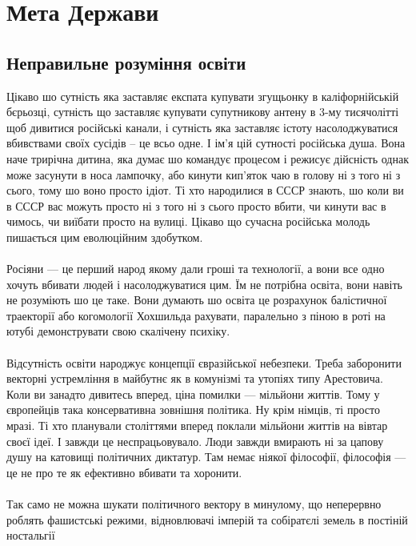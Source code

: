 
\section{Мета Держави}

\subsection{Неправильне розуміння освіти}

Цікаво шо сутність яка заставляє експата купувати згущьонку в каліфорнійській бєрьозці,
сутність що заставляє купувати супутникову антену в 3-му тисячолітті щоб дивитися
російські канали, і сутність яка заставляє істоту насолоджуватися вбивствами своїх
сусідів -- це всьо одне. І ім'я цій сутності російська душа. Вона наче трирічна
дитина, яка думає шо командує процесом і режисує дійсність однак може засунути
в носа лампочку, або кинути кип'яток чаю в голову ні з того ні з сього, тому шо
воно просто ідіот. Ті хто народилися в СССР знають, шо коли ви в СССР вас можуть
просто ні з того ні з сього просто вбити, чи кинути вас в чимось, чи виїбати
просто на вулиці. Цікаво що сучасна російська молодь пишається цим еволюційним здобутком.
\\
\\
Росіяни — це перший народ якому дали гроші та технології, а вони все одно хочуть
вбивати людей і насолоджуватися цим. Їм не потрібна освіта, вони навіть не
розуміють шо це таке. Вони думають шо освіта це розрахунок балістичної траекторії
або когомології Хохшильда рахувати, паралельно з піною в роті на ютубі демонструвати
свою скалічену психіку.
\\
\\
Відсутність освіти народжує концепції євразійської небезпеки. Треба заборонити
векторні устремління в майбутнє як в комунізмі та утопіях типу Арестовича.
Коли ви занадто дивитесь вперед, ціна помилки — мільйони життів. Тому у європейців
така консервативна зовнішня політика. Ну крім німців, ті просто мразі.
Ті хто планували століттями вперед поклали мільйони життів на вівтар своєї ідеї.
І завжди це неспрацьовувало. Люди завжди вмирають ні за цапову душу на катовищі
політичних диктатур. Там немає ніякої філософії, філософія — це не про те як
ефективно вбивати та хоронити.
\\
\\
Так само не можна шукати політичного вектору в минулому, що неперервно роблять
фашистські режими, відновлювачі імперій та собіратєлі земель в постіній ностальгії
